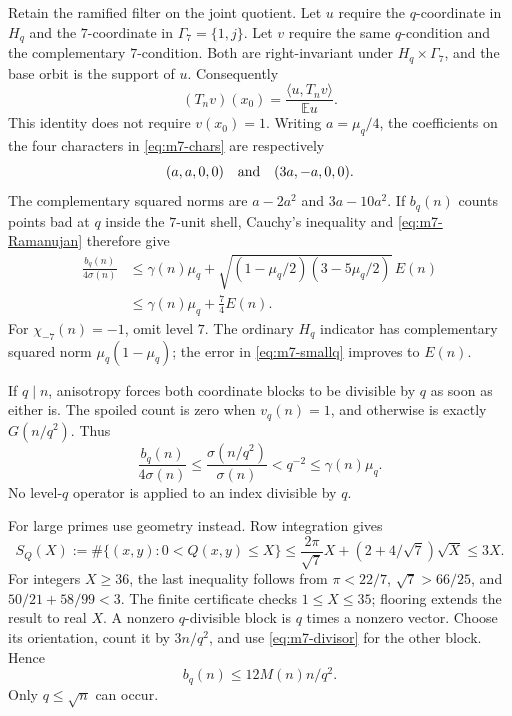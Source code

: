 Retain the ramified filter on the joint quotient. Let \(u\) require
the \(q\)-coordinate in \(H_q\) and the \(7\)-coordinate in
\(\Gamma_7=\{1,j\}\). Let \(v\) require the same \(q\)-condition and
the complementary \(7\)-condition. Both are right-invariant under
\(H_q\times\Gamma_7\), and the base orbit is the support of \(u\).
Consequently
\[
                     (T_nv)(x_0)
                       =\frac{\langle u,T_nv\rangle}{\mathbb E u}.
\]
This identity does not require \(v(x_0)=1\).
Writing \(a=\mu_q/4\), the coefficients on the four characters
in \eqref{eq:m7-chars} are respectively
\[
             (a,a,0,0)\quad\hbox{and}\quad(3a,-a,0,0).
\]
The complementary squared norms are \(a-2a^2\) and \(3a-10a^2\).
If \(b_q(n)\) counts points bad at \(q\) inside the \(7\)-unit shell,
Cauchy's inequality and \eqref{eq:m7-Ramanujan} therefore give
\begin{equation}
\begin{aligned}
 \frac{b_q(n)}{4\sigma(n)}
 &\le \gamma(n)\mu_q+
          \sqrt{(1-\mu_q/2)(3-5\mu_q/2)}\,E(n)\\
 &\le \gamma(n)\mu_q+\tfrac74 E(n).                            \end{aligned}\label{eq:m7-smallq}
\end{equation}
For \(\chi_{-7}(n)=-1\), omit level \(7\). The ordinary \(H_q\)
indicator has complementary squared norm \(\mu_q(1-\mu_q)\);
the error in \eqref{eq:m7-smallq} improves to \(E(n)\).

If \(q\mid n\), anisotropy forces both coordinate blocks to be
divisible by \(q\) as soon as either is. The spoiled count is zero
when \(v_q(n)=1\), and otherwise is exactly \(G(n/q^2)\).
Thus
\begin{equation}
 \frac{b_q(n)}{4\sigma(n)}
       \le\frac{\sigma(n/q^2)}{\sigma(n)}
           <q^{-2}\le\gamma(n)\mu_q.                           \label{eq:m7-targetprime}
\end{equation}
No level-\(q\) operator is applied to an index divisible by \(q\).

For large primes use geometry instead. Row integration gives
\[
 S_Q(X):=\#\{(x,y):0<Q(x,y)\le X\}
 \le \frac{2\pi}{\sqrt7}X+(2+4/\sqrt7)\sqrt X\le3X .
\]
For integers \(X\ge36\), the last inequality follows from
\(\pi<22/7\), \(\sqrt7>66/25\), and
\(50/21+58/99<3\). The finite certificate checks \(1\le X\le35\);
flooring extends the result to real \(X\).
A nonzero \(q\)-divisible block is \(q\) times a nonzero vector.
Choose its orientation, count it by \(3n/q^2\), and use
\eqref{eq:m7-divisor} for the other block. Hence
\begin{equation}
                         b_q(n)\le12M(n)n/q^2.                \label{eq:m7-largeq}
\end{equation}
Only \(q\le\sqrt n\) can occur.

